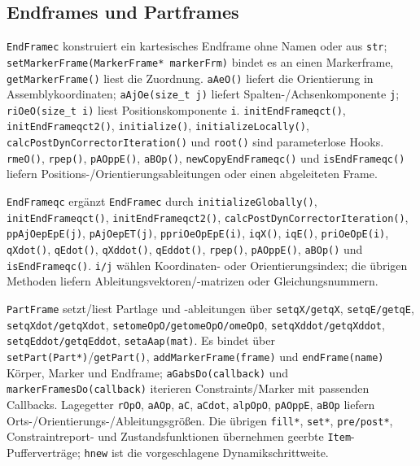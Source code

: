 \documentclass[
  12pt
]{book}
\begin{document}
\hypertarget{endframes-und-partframes}{%
\subsection*{Endframes und Partframes}\label{endframes-und-partframes}}

\texttt{EndFramec} konstruiert ein kartesisches Endframe ohne Namen oder
aus \texttt{str}; \texttt{setMarkerFrame(MarkerFrame*\ markerFrm)}
bindet es an einen Markerframe, \texttt{getMarkerFrame()} liest die
Zuordnung. \texttt{aAeO()} liefert die Orientierung in
Assemblykoordinaten; \texttt{aAjOe(size\_t\ j)} liefert
Spalten-/Achsenkomponente \texttt{j}; \texttt{riOeO(size\_t\ i)} liest
Positionskomponente \texttt{i}. \texttt{initEndFrameqct()},
\texttt{initEndFrameqct2()}, \texttt{initialize()},
\texttt{initializeLocally()}, \texttt{calcPostDynCorrectorIteration()}
und \texttt{root()} sind parameterlose Hooks. \texttt{rmeO()},
\texttt{rpep()}, \texttt{pAOppE()}, \texttt{aBOp()},
\texttt{newCopyEndFrameqc()} und \texttt{isEndFrameqc()} liefern
Positions-/Orientierungsableitungen oder einen abgeleiteten Frame.

\texttt{EndFrameqc} ergänzt \texttt{EndFramec} durch
\texttt{initializeGlobally()}, \texttt{initEndFrameqct()},
\texttt{initEndFrameqct2()}, \texttt{calcPostDynCorrectorIteration()},
\texttt{ppAjOepEpE(j)}, \texttt{pAjOepET(j)}, \texttt{ppriOeOpEpE(i)},
\texttt{iqX()}, \texttt{iqE()}, \texttt{priOeOpE(i)}, \texttt{qXdot()},
\texttt{qEdot()}, \texttt{qXddot()}, \texttt{qEddot()}, \texttt{rpep()},
\texttt{pAOppE()}, \texttt{aBOp()} und \texttt{isEndFrameqc()}.
\texttt{i/j} wählen Koordinaten- oder Orientierungsindex; die übrigen
Methoden liefern Ableitungsvektoren/-matrizen oder Gleichungsnummern.

\texttt{PartFrame} setzt/liest Partlage und -ableitungen über
\texttt{setqX/getqX}, \texttt{setqE/getqE}, \texttt{setqXdot/getqXdot},
\texttt{setomeOpO/getomeOpO/omeOpO}, \texttt{setqXddot/getqXddot},
\texttt{setqEddot/getqEddot}, \texttt{setaAap(mat)}. Es bindet über
\texttt{setPart(Part*)}/\texttt{getPart()},
\texttt{addMarkerFrame(frame)} und \texttt{endFrame(name)} Körper,
Marker und Endframe; \texttt{aGabsDo(callback)} und
\texttt{markerFramesDo(callback)} iterieren Constraints/Marker mit
passenden Callbacks. Lagegetter \texttt{rOpO}, \texttt{aAOp},
\texttt{aC}, \texttt{aCdot}, \texttt{alpOpO}, \texttt{pAOppE},
\texttt{aBOp} liefern Orts-/Orientierungs-/Ableitungsgrößen. Die übrigen
\texttt{fill*}, \texttt{set*}, \texttt{pre/post*}, Constraintreport- und
Zustandsfunktionen übernehmen geerbte \texttt{Item}-Pufferverträge;
\texttt{hnew} ist die vorgeschlagene Dynamikschrittweite.
\end{document}
